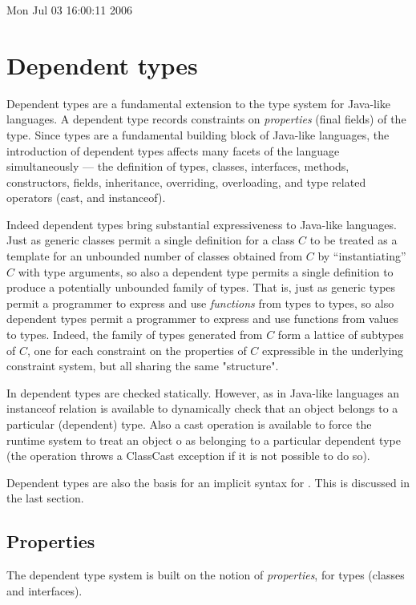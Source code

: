 Mon Jul 03 16:00:11 2006

\chapter{Dependent types}\label{XtenDepTypes}
\def\withmath#1{\relax\ifmmode#1\else{$#1$}\fi}
\def\LL#1{\withmath{\lbrack\!\lbrack #1\rbrack\!\rbrack}}

Dependent types are a fundamental extension to the type system for
Java-like languages. A dependent type records constraints on
{\em properties} (final fields) of the type.  Since types are a fundamental
building block of Java-like languages, the introduction of dependent
types affects many facets of the language simultaneously --- the
definition of types, classes, interfaces, methods, constructors,
fields, inheritance, overriding, overloading, and type related
operators (cast, and instanceof).

Indeed dependent types bring substantial expressiveness to Java-like
languages. Just as generic classes permit a single definition for a
class $C$ to be treated as a template for an unbounded number of classes
obtained from $C$ by ``instantiating'' $C$ with type arguments, so also a
dependent type permits a single definition to produce a potentially
unbounded family of types. That is, just as generic types permit a
programmer to express and use {\em functions} from types to types, so also
dependent types permit a programmer to express and use functions from values
to types.  Indeed, the family of types generated from $C$ form a
lattice of subtypes of $C$, one for each constraint on the properties
of $C$ expressible in the underlying constraint system, but all sharing
the same "structure".

In \Xten{} dependent types are checked statically. However, as in
Java-like languages an instanceof relation is available to dynamically
check that an object belongs to a particular (dependent) type. Also a
cast operation is available to force the runtime system to treat an
object o as belonging to a particular dependent type (the operation
throws a ClassCast exception if it is not possible to do so).

Dependent types are also the basis for an implicit syntax for
\Xten{}. This is discussed in the last section.

\section{Properties}\label{DepType:Properties}
The dependent type system is built on the notion of {\em properties}, 
for types (classes and interfaces).


